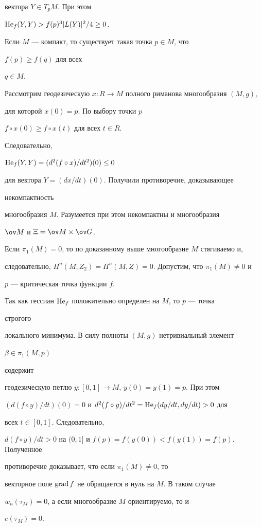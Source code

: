 \begin{pf}
вектора $Y\in T_pM$. При этом 


$\operatorname{He}_f(Y,Y)>f(p)^3|L(Y)|^2/4\ge 0$. 


Если $M$ --- компакт, то существует такая точка $p\in M$, что 


$f(p)\ge f(q)$ для всех 


$q\in M$. 


Рассмотрим геодезическую $x:R\to M$ полного риманова многообразия $(M,g)$, 


для которой $x(0)=p$. По выбору точки $p\;$ 


$f\circ x(0)\ge f\circ x(t)$ для всех $t\in R$. 


Следовательно, 


$\operatorname{He}_f(Y,Y)=(d^2(f\circ x)/dt^2)(0)\le 0$ 


для вектора $Y=(dx/dt)(0)$. Получили противоречие, доказывающее 


некомпактность 


многообразия $M$. Разумеется при этом некомпактны и многообразия 


$\ov M$ и $\Xi=\ov M\times\ov G$. 


 


Если $\pi_1(M)=0$, то по доказанному выше многообразие $M$ стягиваемо и, 


следовательно, $H^n(M,Z_2)=H^n(M,Z)=0$. Допустим, что $\pi_1(M)\ne 0$ и 


$p$ --- критическая точка функции $f$. 


Так как гессиан $\operatorname{He}_f$ положительно определен на $M$, то $p$ --- точка 


строгого 


локального минимума. В силу полноты $(M,g)$ нетривиальный элемент 


$\beta\in\pi_1(M,p)$ 


содержит 


геодезическую петлю $y:[0,1]\to M$, $y(0)=y(1)=p$. При этом 


$(d(f\circ y)/dt)(0)=0$ и $d^2(f\circ y)/dt^2=\operatorname{He}_f(dy/dt,dy/dt)>0$ для 


всех $t\in[0,1]$. Следовательно, 


$d(f\circ y)/dt>0$ на $(0,1]$ и $f(p)=f(y(0))<f(y(1))=f(p)$. Полученное 


противоречие доказывает, что если $\pi_1(M)\ne 0$, то 


векторное поле $\operatorname{grad} f$ не обращается в нуль на $M$. В таком случае 


$w_n(\tau_M)=0$, а если многообразие $M$ ориентируемо, то и 


$e(\tau_M)=0$. 


\end{pf} 


